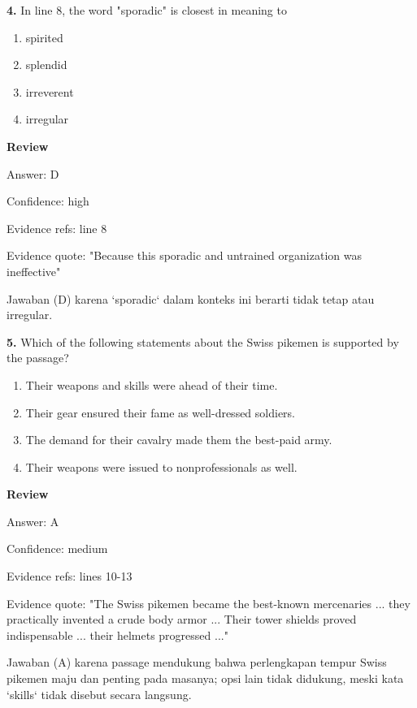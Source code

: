 \documentclass[12pt]{article}
\begin{document}
\endgroup
\par
\vspace{0.25\baselineskip}
\noindent\textbf{4.} In line 8, the word "sporadic" is closest in meaning to
\begin{enumerate}[label=(\Alph*),leftmargin=*,itemsep=0.2em]
\item spirited
\item splendid
\item irreverent
\item irregular
\end{enumerate}
\par
\begingroup
\setlength{\parskip}{0pt}
\setlength{\parindent}{0pt}
\textbf{Review}\par
Answer: D\par
Confidence: high\par
Evidence refs: line 8\par
Evidence quote: "Because this sporadic and untrained organization was ineffective"\par
Jawaban (D) karena `sporadic` dalam konteks ini berarti tidak tetap atau irregular.\par
\endgroup
\par
\vspace{0.25\baselineskip}
\noindent\textbf{5.} Which of the following statements about the Swiss pikemen is supported by the passage?
\begin{enumerate}[label=(\Alph*),leftmargin=*,itemsep=0.2em]
\item Their weapons and skills were ahead of their time.
\item Their gear ensured their fame as well-dressed soldiers.
\item The demand for their cavalry made them the best-paid army.
\item Their weapons were issued to nonprofessionals as well.
\end{enumerate}
\par
\begingroup
\setlength{\parskip}{0pt}
\setlength{\parindent}{0pt}
\textbf{Review}\par
Answer: A\par
Confidence: medium\par
Evidence refs: lines 10-13\par
Evidence quote: "The Swiss pikemen became the best-known mercenaries ... they practically invented a crude body armor ... Their tower shields proved indispensable ... their helmets progressed ..."\par
Jawaban (A) karena passage mendukung bahwa perlengkapan tempur Swiss pikemen maju dan penting pada masanya; opsi lain tidak didukung, meski kata `skills` tidak disebut secara langsung.\par
\end{document}
